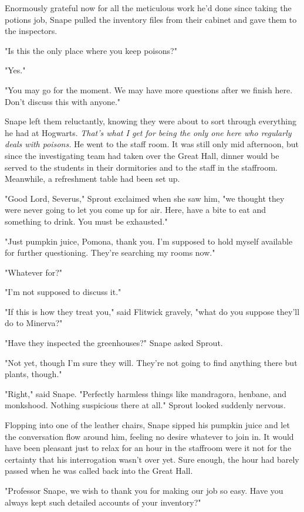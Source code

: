 Enormously grateful now for all the meticulous work he'd done since taking the potions job, Snape pulled the inventory files from their cabinet and gave them to the inspectors.

"Is this the only place where you keep poisons?"

"Yes."

"You may go for the moment. We may have more questions after we finish here. Don't discuss this with anyone."

Snape left them reluctantly, knowing they were about to sort through everything he had at Hogwarts. \emph{That's what I get for being the only one here who regularly deals with poisons.} He went to the staff room. It was still only mid afternoon, but since the investigating team had taken over the Great Hall, dinner would be served to the students in their dormitories and to the staff in the staffroom. Meanwhile, a refreshment table had been set up.

"Good Lord, Severus," Sprout exclaimed when she saw him, "we thought they were never going to let you come up for air. Here, have a bite to eat and something to drink. You must be exhausted."

"Just pumpkin juice, Pomona, thank you. I'm supposed to hold myself available for further questioning. They're searching my rooms now."

"Whatever for?"

"I'm not supposed to discuss it."

"If this is how they treat you," said Flitwick gravely, "what do you suppose they'll do to Minerva?"

"Have they inspected the greenhouses?" Snape asked Sprout.

"Not yet, though I'm sure they will. They're not going to find anything there but plants, though."

"Right," said Snape. "Perfectly harmless things like mandragora, henbane, and monkshood. Nothing suspicious there at all." Sprout looked suddenly nervous.

Flopping into one of the leather chairs, Snape sipped his pumpkin juice and let the conversation flow around him, feeling no desire whatever to join in. It would have been pleasant just to relax for an hour in the staffroom were it not for the certainty that his interrogation wasn't over yet. Sure enough, the hour had barely passed when he was called back into the Great Hall.

"Professor Snape, we wish to thank you for making our job so easy. Have you always kept such detailed accounts of your inventory?"

